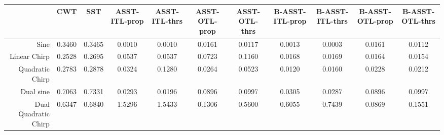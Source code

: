 \begin{tabular}{|r|c|c|c|c|c|c|c|c|c|c|}
\toprule
 & CWT & SST & ASST-ITL-prop & ASST-ITL-thrs & ASST-OTL-prop & ASST-OTL-thrs & B-ASST-ITL-prop & B-ASST-ITL-thrs & B-ASST-OTL-prop & B-ASST-OTL-thrs \\
\midrule
Sine & 0.3460 & 0.3465 & 0.0010 & 0.0010 & 0.0161 & 0.0117 & 0.0013 & 0.0003 & 0.0161 & 0.0112 \\
Linear Chirp & 0.2528 & 0.2695 & 0.0537 & 0.0537 & 0.0723 & 0.1160 & 0.0168 & 0.0169 & 0.0164 & 0.0154 \\
Quadratic Chirp & 0.2783 & 0.2878 & 0.0324 & 0.1280 & 0.0264 & 0.0523 & 0.0120 & 0.0160 & 0.0228 & 0.0212 \\
Dual sine & 0.7063 & 0.7331 & 0.0293 & 0.0196 & 0.0896 & 0.0997 & 0.0305 & 0.0287 & 0.0896 & 0.0997 \\
Dual Quadratic Chirp & 0.6347 & 0.6840 & 1.5296 & 1.5433 & 0.1306 & 0.5600 & 0.6055 & 0.7439 & 0.0869 & 0.1551 \\
\bottomrule
\end{tabular}
